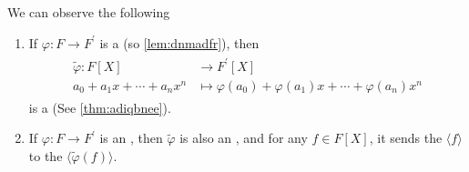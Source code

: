\documentclass{article}
\begin{document}
\begin{lema}We can observe the following 
\begin{enumerate}
    \item If $\varphi: F \rightarrow F^{\prime}$ is a  (so  \cref{lem:dnmadfr}), then
\begin{align*}
\begin{aligned}
\tilde{\varphi}: F[X] & \rightarrow F^{\prime}[X] \\
a_{0}+a_{1} x+\cdots+a_{n} x^{n} & \mapsto \varphi\left(a_{0}\right)+\varphi\left(a_{1}\right) x+\cdots+\varphi\left(a_{n}\right) x^{n}
\end{aligned}
\end{align*}
is a  (See \cref{thm:adiqbnee}). 
\item If $\varphi: F \rightarrow F^{\prime}$ is an , then $\tilde{\varphi}$ is also an , and for any $f \in F[X]$, it sends the  $\langle f\rangle$ to the  $\langle\tilde{\varphi}(f)\rangle$.
\end{enumerate}
\end{lema}
\end{document}
